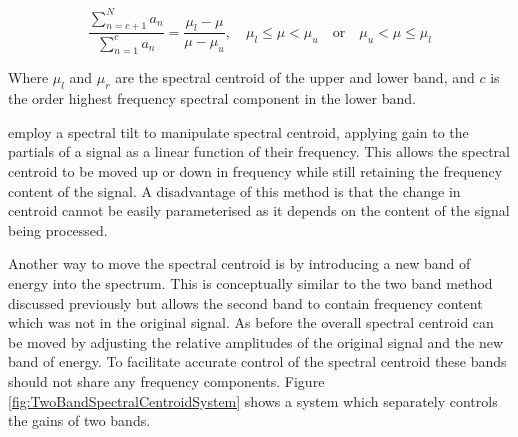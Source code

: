 			\begin{equation}
				\frac{\sum_{n = c + 1}^{N} a_{n}}
				     {{\sum_{n = 1}^{c} a_{n}}} = 
				\frac{\mu_{l} - \mu}{\mu - \mu_{u}}, 
				\quad \mu_{l} \leq \mu < \mu_{u} \quad \textrm{or} \quad \mu_{u} < \mu \leq \mu_{l}
				\label{eq:SpectralCentroidManipulation}
			\end{equation}

			Where $\mu_{l}$ and $\mu_{r}$ are the spectral centroid of the upper and lower band, and $c$ is the
			order highest frequency spectral component in the lower band.

			\citet{williams2007perceptually} employ a spectral tilt to manipulate spectral centroid, applying
			gain to the partials of a signal as a linear function of their frequency. This allows the spectral
			centroid to be moved up or down in frequency while still retaining the frequency content of the
			signal. A disadvantage of this method is that the change in centroid cannot be easily parameterised
			as it depends on the content of the signal being processed.

			Another way to move the spectral centroid is by introducing a new band of energy into the spectrum.
			This is conceptually similar to the two band method discussed previously but allows the second band
			to contain frequency content which was not in the original signal. As before the overall spectral
			centroid can be moved by adjusting the relative amplitudes of the original signal and the new band
			of energy. To facilitate accurate control of the spectral centroid these bands should not share any
			frequency components. Figure \ref{fig:TwoBandSpectralCentroidSystem} shows a system which
			separately controls the gains of two bands.

